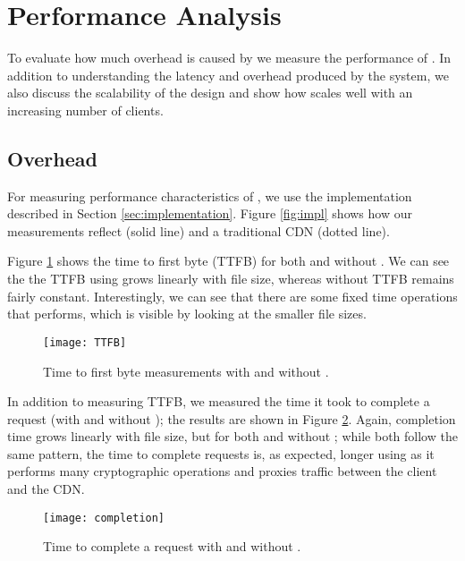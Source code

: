 \section{Performance Analysis}
\label{sec:performance}
To evaluate how much overhead is caused by \system{} we measure the performance 
of \system{}.  In addition to understanding the latency and overhead produced by the 
system, we also discuss the scalability of the design and show how \system{} scales 
well with an increasing number of clients.

\subsection{\system{} Overhead}
For measuring performance characteristics of \system{}, we use the implementation 
described in Section \ref{sec:implementation}.  Figure \ref{fig:impl} shows 
how our measurements reflect \system{} (solid line) and a traditional CDN (dotted 
line).  

Figure \ref{fig:ttfb} shows the time to first byte (TTFB) for both \system{} and 
without \system{}.  We can see the the TTFB using \system{} grows linearly with 
file size, whereas without \system{} TTFB remains fairly constant.  Interestingly, 
we can see that there are some fixed time operations that \system{} performs, which 
is visible by looking at the smaller file sizes.

\begin{figure}[t!]
\centering
\texttt{[image: TTFB]}
\caption{Time to first byte measurements with and without \system{}.}
\label{fig:ttfb}
\end{figure}

In addition to measuring TTFB, we measured the time it took to complete a request (with and 
without \system{}); the results are shown in Figure \ref{fig:completion}.  Again, completion time 
grows linearly with file size, but for both \system{} and without \system{}; while both follow the 
same pattern, the time to complete requests is, as expected, longer using \system{} as it performs 
many cryptographic operations and proxies traffic between the client and the CDN.  

\begin{figure}[t!]
\centering
\texttt{[image: completion]}
\caption{Time to complete a request with and without \system{}.}
\label{fig:completion}
\end{figure}

